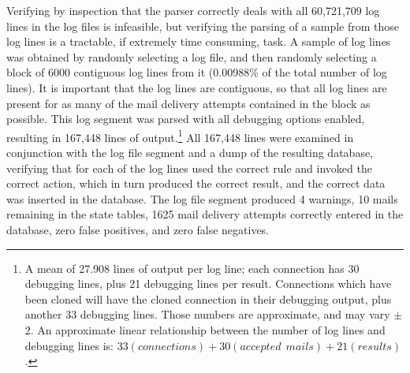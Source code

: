
Verifying by inspection that the parser correctly deals with all 60,721,709
log lines in the \numberOFlogFILES{} log files is infeasible, but verifying
the parsing of a sample from those log lines is a tractable, if extremely
time consuming, task.  A sample of log lines was obtained by randomly
selecting a log file, and then randomly selecting a block of 6000
contiguous log lines from it (0.00988\% of the total number of log lines).
It is important that the log lines are contiguous, so that all log lines
are present for as many of the mail delivery attempts contained in the
block as possible.  This log segment was parsed with all debugging options
enabled, resulting in 167,448 lines of output.\footnote{A mean of 27.908
lines of output per log line; each connection has 30 debugging lines, plus
21 debugging lines per result.  Connections which have been cloned will
have the cloned connection in their debugging output, plus another 33
debugging lines.  Those numbers are approximate, and may vary $\pm{}$ 2.
An approximate linear relationship between the number of log lines and
debugging lines is: $33(connections) + 30(accepted~~mails) + 21(results)$.}
All 167,448 lines were examined in conjunction with the log file segment
and a dump of the resulting database, verifying that for each of the log
lines \parsername{} used the correct rule and invoked the correct action,
which in turn produced the correct result, and the correct data was
inserted in the database.  The log file segment produced 4 warnings, 10
mails remaining in the state tables, 1625 mail delivery attempts correctly
entered in the database, zero false positives, and zero false negatives.

